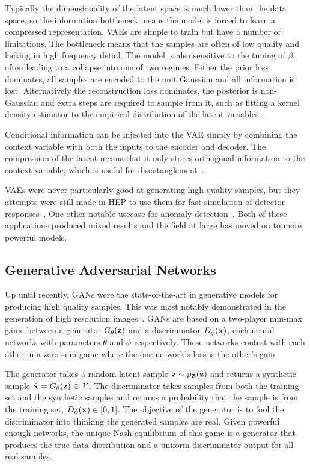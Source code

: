 Typically the dimensionality of the latent space is much lower than the data space, so the information bottleneck means the model is forced to learn a compressed representation.
VAEs are simple to train but have a number of limitations.
The bottleneck means that the samples are often of low quality and lacking in high frequency detail.
The model is also sensitive to the tuning of $\beta$, often leading to a collapse into one of two regimes.
Either the prior loss dominates, all samples are encoded to the unit Gaussian and all information is lost.
Alternatively the reconstruction loss dominates, the posterior is non-Gaussian and extra steps are required to sample from it, such as fitting a kernel density estimator to the empirical distribution of the latent variables~\cite{KDEVAE}.

Conditional information can be injected into the VAE simply by combining the context variable with both the inputs to the encoder and decoder.
The compression of the latent means that it only stores orthogonal information to the context variable, which is useful for disentanglement~\cite{cVAE}.

VAEs were never particularly good at generating high quality samples, but they attempts were still made in HEP to use them for fast simulation of detector responses~\cite{VariationalAutoencodersJet, GraphVariationalAutoencoder, ParticlebasedFastJet}.
One other notable usecase for anomaly detection~\cite{VariationalAutoencodersAnomalous, DeepSetVAE, MassiveIssueAnomaly}.
Both of these applications produced mixed results and the field at large has moved on to more powerful models.


\subsection{Generative Adversarial Networks}

Up until recently, GANs were the state-of-the-art in generative models for producing high quality samples.
This was most notably demonstrated in the generation of high resolution images~\cite{StyleGAN2,StyleGAN3}.
GANs are based on a two-player min-max game between a generator $G_\theta(\mathbf{z})$ and a discriminator $D_\phi(\mathbf{x})$, each neural networks with parameters $\theta$ and $\phi$ respectively.
These networks contest with each other in a zero-sum game where the one network's loss is the other's gain.

The generator takes a random latent sample $\mathbf{z} \sim p_{\mathbf{Z}}(\mathbf{z})$ and returns a synthetic sample $\hat{\mathbf{x}} = G_\theta(\mathbf{z}) \in \mathcal{X}$.
The discriminator takes samples from both the training set and the synthetic samples and returns a probability that the sample is from the training set, $D_\phi(\mathbf{x}) \in [0, 1]$.
The objective of the generator is to fool the discriminator into thinking the generated samples are real.
Given powerful enough networks, the unique Nash equilibrium of this game is a generator that produces the true data distribution and a uniform discriminator output for all real samples.

